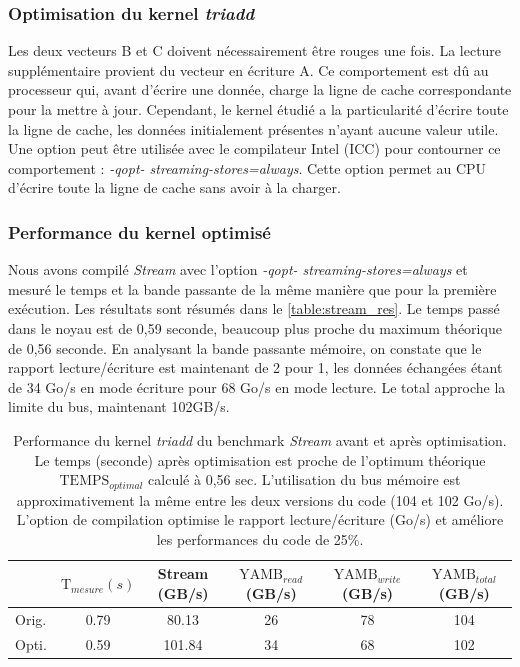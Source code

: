 \subsubsection{Optimisation du kernel \textit{triadd}}

Les deux vecteurs B et C doivent nécessairement être rouges une fois. La lecture supplémentaire provient du vecteur en écriture A. Ce comportement est dû au processeur qui, avant d'écrire une donnée, charge la ligne de cache correspondante pour la mettre à jour. Cependant, le kernel étudié a la particularité d'écrire toute la ligne de cache, les données initialement présentes n'ayant aucune valeur utile. Une option peut être utilisée avec le compilateur Intel (ICC) pour contourner ce comportement : \textit{-qopt- streaming-stores=always}. Cette option permet au CPU d'écrire toute la ligne de cache sans avoir à la charger.


\subsubsection{Performance du kernel optimisé}

Nous avons compilé \textit{Stream} avec l'option \textit{-qopt- streaming-stores=always} et mesuré le temps et la bande passante de la même manière que pour la première exécution. Les résultats sont résumés dans le \autoref{table:stream_res}. Le temps passé dans le noyau est de 0,59 seconde, beaucoup plus proche du maximum théorique de 0,56 seconde. En analysant la bande passante mémoire, on constate que le rapport lecture/écriture est maintenant de 2 pour 1, les données échangées étant de 34 Go/s en mode écriture pour 68 Go/s en mode lecture. Le total approche la limite du bus, maintenant 102GB/s.

 \renewcommand{\arraystretch}{1.2}
    \setlength{\tabcolsep}{8pt}
    
    \begin{table}[htbp]
        \centering

        \caption{Performance du kernel \textit{triadd} du benchmark \textit{Stream} avant et après optimisation. Le temps (seconde) après optimisation est proche de l'optimum théorique $\text{TEMPS}_{optimal}$  calculé à 0,56 sec. L'utilisation du bus mémoire est approximativement la même entre les deux versions du code (104 et 102 Go/s). L'option de compilation optimise le rapport lecture/écriture (Go/s) et améliore les performances du code de 25\%.}

            \begin{tabular}{l|c|c|c|c|c|}
            \cline{2-6}
                                            & $\text{T}_{mesure} (s)$ & Stream  (GB/s) & $\text{YAMB}_{read}$ (GB/s) & $\text{YAMB}_{write}$ (GB/s) & $\text{YAMB}_{total}$ (GB/s) \\ \hline
            \multicolumn{1}{|l|}{Orig.}  & 0.79   & 80.13  & 26        & 78         & 104        \\ \hline
            \multicolumn{1}{|l|}{Opti.} & 0.59   & 101.84 & 34        & 68         & 102        \\ \hline
            \end{tabular}
            \label{table:stream_res}
        \end{table}